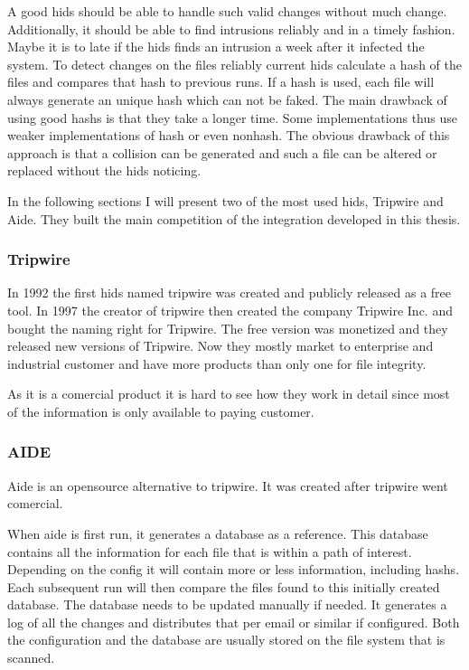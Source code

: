 A good \gls{hids} should be able to handle such valid changes without much change. Additionally, it should be able to find intrusions reliably and in a timely fashion. Maybe it is to late if the \gls{hids} finds an intrusion a week after it infected the system. To detect changes on the files reliably current \gls{hids} calculate a hash of the files and compares that hash to previous runs. If a \gls{hash} is used, each file will always generate an unique hash which can not be faked. The main drawback of using good \glspl{hash} is that they take a longer time. Some implementations thus use weaker implementations of \gls{hash} or even \gls{nonhash}. The obvious drawback of this approach is that a collision can be generated and such a file can be altered or replaced without the \gls{hids} noticing. 

In the following sections I will present two of the most used \gls{hids}, Tripwire and Aide. They built the main competition of the integration developed in this thesis.

\subsubsection{Tripwire}
\label{sec:tripwire}

In 1992 the first \gls{hids} named tripwire was created and publicly released as a free tool. In 1997 the creator of tripwire then created the company Tripwire Inc. and bought the naming right for Tripwire. The free version was monetized and they released new versions of Tripwire. \cite{Tripwire:Impl,Tripwire:company} Now they mostly market to enterprise and industrial customer and have more products than only one for file integrity. \cite{tripwire}

As it is a comercial product it is hard to see how they work in detail since most of the information is only available to paying customer. 

\subsubsection{AIDE}
\label{sec:aide}

Aide is an \gls{opensource} alternative to tripwire. It was created after tripwire went comercial. \cite{aide:totherescue, aide:github}

When aide is first run, it generates a database as a reference. This database contains all the information for each file that is within a path of interest. Depending on the config it will contain more or less information, including \glspl{hash}. Each subsequent run will then compare the files found to this initially created database. The database needs to be updated manually if needed. It generates a log of all the changes and distributes that per email or similar if configured. Both the configuration and the database are usually stored on the file system that is scanned. \cite{aide, aide:doc}

